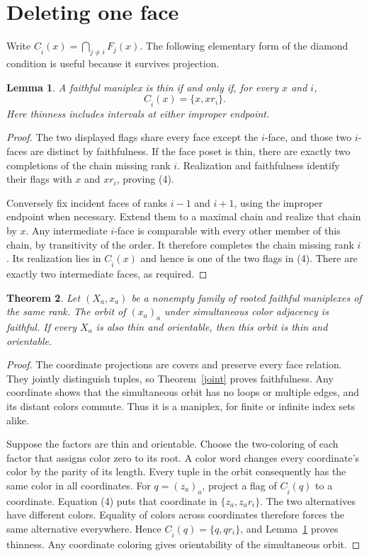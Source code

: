 \documentclass[a4paper,11pt]{article}
\newtheorem{theorem}{Theorem}\newtheorem{lemma}[theorem]{Lemma}
\begin{document}
\section{Deleting one face}
Write $C_{\widehat i}(x)=\bigcap_{j\ne i}F_j(x)$. The following
elementary form of the diamond condition is useful because it survives
projection.
\begin{lemma}\label{thin}
A faithful maniplex is thin if and only if, for every $x$ and $i$,
\[
 C_{\widehat i}(x)=\{x,xr_i\}.
 \tag{4}
\]
Here thinness includes intervals at either improper endpoint.
\end{lemma}
\begin{proof}
The two displayed flags share every face except the $i$-face, and
those two $i$-faces are distinct by faithfulness. If the face poset
is thin, there are exactly two completions of the chain missing rank
$i$. Realization and faithfulness identify their flags with $x$ and
$xr_i$, proving (4).

Conversely fix incident faces of ranks $i-1$ and $i+1$, using the
improper endpoint when necessary. Extend them to a maximal chain
and realize that chain by $x$. Any intermediate $i$-face is comparable
with every other member of this chain, by transitivity of the order.
It therefore completes the chain missing rank $i$. Its realization
lies in $C_{\widehat i}(x)$ and hence is one of the two flags in (4).
There are exactly two intermediate faces, as required.
\end{proof}

\begin{theorem}\label{mix}
Let $(X_a,x_a)$ be a nonempty family of rooted faithful maniplexes
of the same rank. The orbit of $(x_a)_a$ under simultaneous color
adjacency is faithful. If every $X_a$ is also thin and orientable,
then this orbit is thin and orientable.
\end{theorem}
\begin{proof}
The coordinate projections are covers and preserve every face relation.
They jointly distinguish tuples, so Theorem~\ref{joint} proves
faithfulness. Any coordinate shows that the simultaneous orbit has
no loops or multiple edges, and its distant colors commute. Thus it
is a maniplex, for finite or infinite index sets alike.

Suppose the factors are thin and orientable. Choose the two-coloring
of each factor that assigns color zero to its root. A color word
changes every coordinate's color by the parity of its length.
Every tuple in the orbit consequently has the same color in all
coordinates. For $q=(z_a)_a$, project a flag of
$C_{\widehat i}(q)$ to a coordinate. Equation (4) puts that coordinate
in $\{z_a,z_ar_i\}$. The two alternatives have different colors.
Equality of colors across coordinates therefore forces the same
alternative everywhere. Hence
$C_{\widehat i}(q)=\{q,qr_i\}$, and Lemma~\ref{thin} proves thinness.
Any coordinate coloring gives orientability of the simultaneous orbit.
\end{proof}
\end{document}
